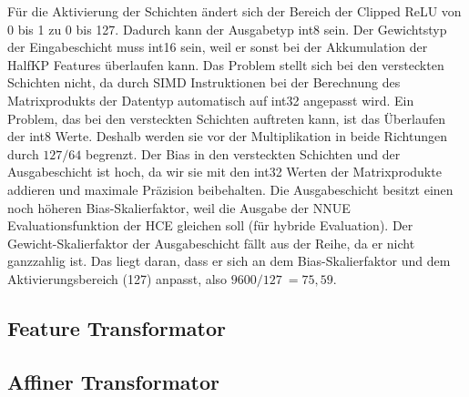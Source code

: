 Für die Aktivierung der Schichten ändert sich der Bereich der Clipped \ac{ReLU} von 0 bis 1 zu 0 bis 127. Dadurch kann der Ausgabetyp int8 sein. Der Gewichtstyp der Eingabeschicht muss int16 sein, weil er sonst bei der Akkumulation der HalfKP Features überlaufen kann. Das Problem stellt sich bei den versteckten Schichten nicht, da durch \ac{SIMD} Instruktionen bei der Berechnung des Matrixprodukts der Datentyp automatisch auf int32 angepasst wird. Ein Problem, das bei den versteckten Schichten auftreten kann, ist das Überlaufen der int8 Werte. Deshalb werden sie vor der Multiplikation in beide Richtungen durch $127/64$ begrenzt. Der Bias in den versteckten Schichten und der Ausgabeschicht ist hoch, da wir sie mit den int32 Werten der Matrixprodukte addieren und maximale Präzision beibehalten. Die Ausgabeschicht besitzt einen noch höheren Bias-Skalierfaktor, weil die Ausgabe der \ac{NNUE} Evaluationsfunktion der \ac{HCE} gleichen soll (für hybride Evaluation). Der Gewicht-Skalierfaktor der Ausgabeschicht fällt aus der Reihe, da er nicht ganzzahlig ist. Das liegt daran, dass er sich an dem Bias-Skalierfaktor und dem Aktivierungsbereich (127) anpasst, also $9600/127~=75,59$.

\subsection{Feature Transformator}


\subsection{Affiner Transformator}
